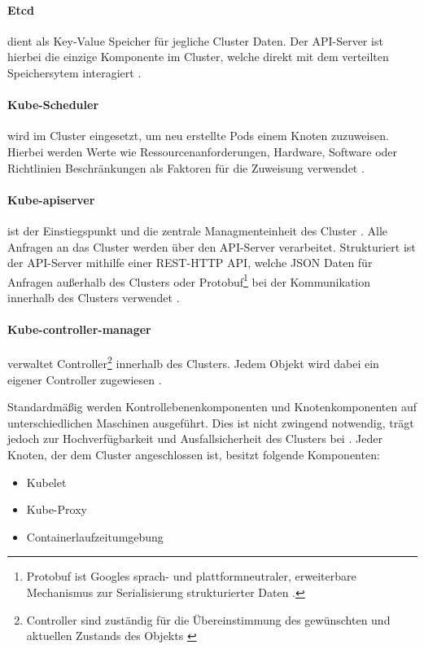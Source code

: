 \paragraph{Etcd} dient als Key-Value Speicher für jegliche Cluster Daten.
Der API-Server ist hierbei die einzige Komponente im Cluster, welche direkt mit dem verteilten Speichersytem interagiert \cite{Hausenblas2019}.

\paragraph{Kube-Scheduler} wird im Cluster eingesetzt, um neu erstellte Pods einem Knoten zuzuweisen.
Hierbei werden Werte wie Ressourcenanforderungen, Hardware, Software oder Richtlinien Beschränkungen 
als Faktoren für die Zuweisung verwendet \cite{kubernetesComponents}.

\paragraph{Kube-apiserver} ist der Einstiegspunkt und die zentrale Managmenteinheit des Cluster \cite{Hausenblas2019}. 
Alle Anfragen an das Cluster werden über den API-Server verarbeitet.
Strukturiert ist der API-Server mithilfe einer REST-HTTP API, welche JSON Daten für Anfragen außerhalb des Clusters
oder Protobuf\footnote{Protobuf ist Googles sprach- und plattformneutraler, erweiterbare Mechanismus zur Serialisierung strukturierter Daten \cite{protobuf}.}
bei der Kommunikation innerhalb des Clusters verwendet \cite{Hausenblas2019}.

\paragraph{Kube-controller-manager} verwaltet Controller\footnote{Controller sind zuständig für die Übereinstimmung des gewünschten und aktuellen Zustands des Objekts \cite{kubernetesControllers}} 
innerhalb des Clusters.
Jedem Objekt wird dabei ein eigener Controller zugewiesen \cite{kubernetesControllers}.

\vspace{5mm}
Standardmäßig werden Kontrollebenenkomponenten und Knotenkomponenten auf unterschiedlichen Maschinen ausgeführt.
Dies ist nicht zwingend notwendig, trägt jedoch zur Hochverfügbarkeit und Ausfallsicherheit des Clusters bei \cite{kubernetesComponents}. 
Jeder Knoten, der dem Cluster angeschlossen ist, besitzt folgende Komponenten:
\begin{itemize}
  \item Kubelet
  \item Kube-Proxy
  \item Containerlaufzeitumgebung
\end{itemize}

